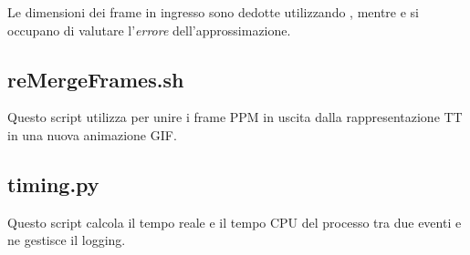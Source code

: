 \documentclass[11pt,a4paper]{article}
\begin{document}
Le dimensioni dei frame in ingresso sono dedotte utilizzando , mentre  e  si occupano di valutare l'\emph{errore} dell'approssimazione.


\newpage
\subsection{reMergeFrames.sh}\label{code:reMergeFrames}
Questo script utilizza  per unire i frame PPM in uscita dalla rappresentazione TT in una nuova animazione GIF.


\newpage
\subsection{timing.py}\label{code:timing}
Questo script calcola il tempo reale e il tempo CPU del processo tra due eventi e ne gestisce il logging.


\end{document}
